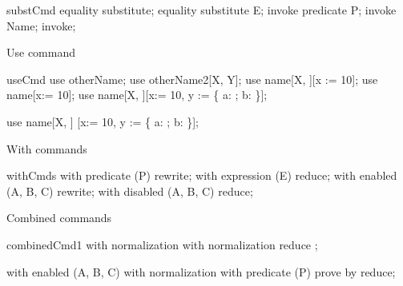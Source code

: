\begin{zproof}{substCmd}
equality substitute;
equality substitute E;
invoke predicate P;
invoke Name;
invoke;
\end{zproof}

Use command

\begin{zproof}{useCmd}
use otherName;
use otherName2[X, Y];
use name[X, \power \nat][x := 10];
use name[x:= 10]; 
use name[X, \power \nat][x:= 10, 
  y := \{ a: \nat; b: \nat \}];

use name[X, \power \nat]
[x:= 10,
  y := \{ a: \nat; b: \nat \}];
\end{zproof}

With commands

\begin{zproof}{withCmds}
with predicate (P) rewrite;
with expression (E) reduce;
with enabled (A, B, C) rewrite;
with disabled (A, B, C) reduce;
\end{zproof}

Combined commands

\begin{zproof}{combinedCmd1}
with normalization
      with
          normalization
              reduce
      ;           %

with enabled (A, B, C)
  with normalization
    with predicate (P)
      prove by reduce;
\end{zproof}



